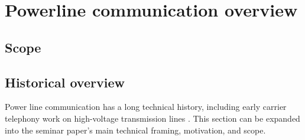 \section{Powerline communication overview}
\label{sec:overview}
\subsection{Scope}



\subsection{Historical overview}

Power line communication has a long technical history, including early carrier telephony work on high-voltage transmission lines \cite{Wolfe1925CarrierTelephonyHighVoltagePowerLines}. This section can be expanded into the seminar paper's main technical framing, motivation, and scope.
